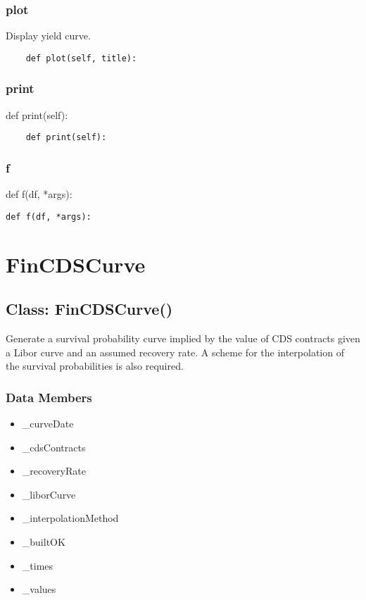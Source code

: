 \documentclass[twoside,11pt]{book}
\begin{document}
\subsubsection*{{\bf plot}}
Display yield curve.  

\begin{lstlisting}
    def plot(self, title):
\end{lstlisting}

\subsubsection*{{\bf print}}
def print(self): 

\begin{lstlisting}
    def print(self):
\end{lstlisting}

\subsubsection*{{\bf f}}
def f(df, *args): 

\begin{lstlisting}
def f(df, *args):
\end{lstlisting}

\newpage
\section{FinCDSCurve}

\subsection*{Class: FinCDSCurve()}
Generate a survival probability curve implied by the value of CDS contracts given a Libor curve and an assumed recovery rate. A scheme for the interpolation of the survival probabilities is also required.  

\subsubsection*{Data Members}
\begin{itemize}
\item{\_curveDate}
\item{\_cdsContracts}
\item{\_recoveryRate}
\item{\_liborCurve}
\item{\_interpolationMethod}
\item{\_builtOK}
\item{\_times}
\item{\_values}
\end{itemize}
\end{document}
